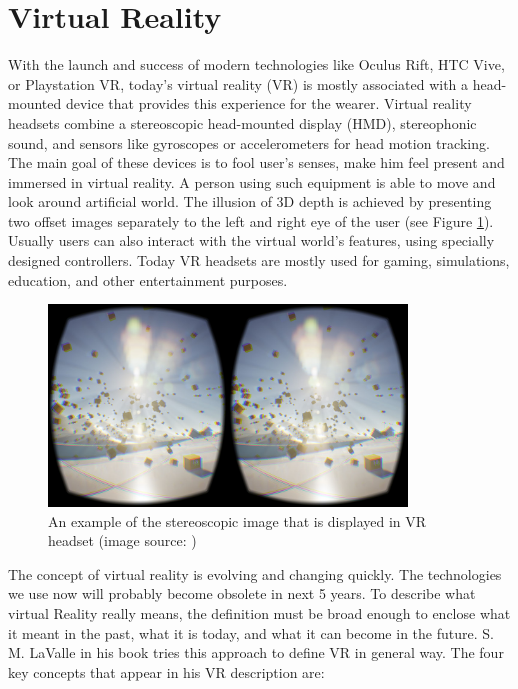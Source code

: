 \section{Virtual Reality}

With the launch and success of modern technologies like Oculus Rift, HTC Vive, or Playstation VR, today’s virtual reality (VR) is mostly associated with a head-mounted device that provides this experience for the wearer. Virtual reality headsets combine a stereoscopic head-mounted display (HMD), stereophonic sound, and sensors like gyroscopes or accelerometers for head motion tracking. The main goal of these devices is to fool user’s senses, make him feel present and immersed in virtual reality. A person using such equipment is able to move and look around artificial world. The illusion of 3D depth is achieved by presenting two offset images separately to the left and right eye of the user (see Figure \ref{fig:STEREOSCOPIC}). Usually users can also interact with the virtual world's features, using specially designed controllers. Today VR headsets are mostly used for gaming, simulations, education, and other entertainment purposes.

\begin{figure}[th]
\centering
\includegraphics[width=0.85\textwidth]{img/stereoscopic.jpg}
\caption{An example of the stereoscopic image that is displayed in VR headset (image source: \cite{STEREOSCOPIC_IMAGE})}
\label{fig:STEREOSCOPIC}
\end{figure}

The concept of virtual reality is evolving and changing quickly. The technologies we use now will probably become obsolete in next 5 years. To describe what virtual Reality really means, the definition must be broad enough to enclose what it meant in the past, what it is today, and what it can become in the future. S. M. LaValle in his book \cite{VR_BOOK} tries this approach to define VR in general way. The four key concepts that appear in his VR description are:

